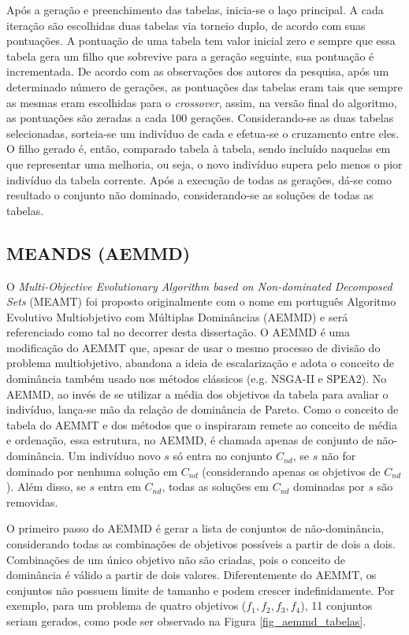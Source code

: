 Após a geração e preenchimento das tabelas, inicia-se o laço principal. A cada iteração são escolhidas duas tabelas via torneio duplo, de acordo com suas pontuações. A pontuação de uma tabela tem valor inicial zero e sempre que essa tabela gera um filho que sobrevive para a geração seguinte, sua pontuação é incrementada. De acordo com as observações dos autores da pesquisa, após um determinado número de gerações, as pontuações das tabelas eram tais que sempre as mesmas eram escolhidas para o \textit{crossover}, assim, na versão final do algoritmo, as pontuações são zeradas a cada 100 gerações. Considerando-se as duas tabelas selecionadas, sorteia-se um indivíduo de cada e efetua-se o cruzamento entre eles. O filho gerado é, então, comparado tabela à tabela, sendo incluído naquelas em que representar uma melhoria, ou seja, o novo indivíduo supera pelo menos o pior indivíduo da tabela corrente. Após a execução de todas as gerações, dá-se como resultado o conjunto não dominado, considerando-se as soluções de todas as tabelas.

\subsection{MEANDS (AEMMD)}
\label{section_aemmd}

O \textit{Multi-Objective Evolutionary Algorithm based on Non-dominated Decomposed Sets} (MEAMT) \cite{Lafeta2016} foi proposto originalmente com o nome em português Algoritmo Evolutivo Multiobjetivo com Múltiplas Dominâncias (AEMMD) e será referenciado como tal no decorrer desta dissertação. O AEMMD é uma modificação do AEMMT que, apesar de usar o mesmo processo de divisão do problema multiobjetivo, abandona a ideia de escalarização e adota o conceito de dominância também usado nos métodos clássicos (e.g. NSGA-II e SPEA2). No AEMMD, ao invés de se utilizar a média dos objetivos da tabela para avaliar o indivíduo, lança-se mão da relação de dominância de Pareto. Como o conceito de tabela do AEMMT e dos métodos que o inspiraram remete ao conceito de média e ordenação, essa estrutura, no AEMMD, é chamada apenas de conjunto de não-dominância. Um indivíduo novo $s$ só entra no conjunto $C_{nd}$, se $s$ não for dominado por nenhuma solução em $C_{nd}$ (considerando apenas os objetivos de $C_{nd}$). Além disso, se $s$ entra em $C_{nd}$, todas as soluções em $C_{nd}$ dominadas por $s$ são removidas.

O primeiro passo do AEMMD é gerar a lista de conjuntos de não-dominância, considerando todas as combinações de objetivos possíveis a partir de dois a dois. Combinações de um único objetivo não são criadas, pois o conceito de dominância é válido a partir de dois valores. Diferentemente do AEMMT, os conjuntos não possuem limite de tamanho e podem crescer indefinidamente. Por exemplo, para um problema de quatro objetivos ($f_1, f_2, f_3, f_4$), 11 conjuntos seriam gerados, como pode ser observado na Figura \ref{fig_aemmd_tabelas}.


